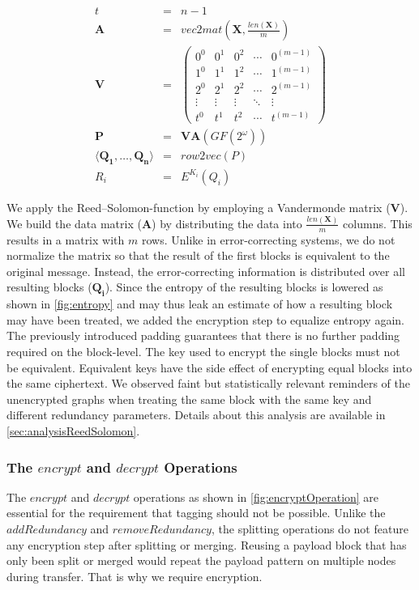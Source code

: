 \begin{eqnarray}
	t          & = & n-1\\%
	\mathbf{A} & = & vec2mat\left(\mathbf{X},\frac{len\left(\mathbf{X}\right)}{m}\right)\\
	\mathbf{V} & = & \left(\begin{matrix}
		0^0 & 0^1 & 0^2 & \cdots & 0^{(m-1)} \\
		1^0 & 1^1 & 1^2 & \cdots & 1^{(m-1)} \\
		2^0 & 2^1 & 2^2 & \cdots & 2^{(m-1)} \\
		\vdots & \vdots & \vdots & \ddots & \vdots \\
		t^0 & t^1 & t^2 & \cdots & t^{(m-1)}
	\end{matrix}\right)\\
	\mathbf{P} & = & \mathbf{V}\mathbf{A} \left(GF\left(2^\omega\right)\right)\\
	\langle \mathbf{Q_1}, \ldots , \mathbf{Q_n} \rangle & = & row2vec(P)\\
	R_i & = & E^{K_i}\left(Q_i\right)
\end{eqnarray}    

We apply the Reed--Solomon-function by employing a Vandermonde matrix ($\mathbf{V}$). We build the data matrix ($\mathbf{A}$) by distributing the data into $\frac{len\left(\mathbf{X}\right)}{m}$ columns. This results in a matrix with $m$ rows. Unlike in error-correcting systems, we do not normalize the matrix so that the result of the first blocks is equivalent to the original message. Instead, the error-correcting information is distributed over all resulting blocks ($\mathbf{Q_i}$). Since the entropy of the resulting blocks is lowered as shown in \cref{fig:entropy} and may thus leak an estimate of how a resulting block may have been treated, we added the encryption step to equalize entropy again. The previously introduced padding guarantees that there is no further padding required on the block-level. The key used to encrypt the single blocks must not be equivalent. Equivalent keys have the side effect of encrypting equal blocks into the same ciphertext. We observed faint but statistically relevant reminders of the unencrypted graphs when treating the same block with the same key and different redundancy parameters. Details about this analysis are available in \cref{sec:analysisReedSolomon}.

\subsubsection{The \texorpdfstring{$encrypt$ and $decrypt$}{encrypt and decrypt} Operations}
The $encrypt$ and $decrypt$ operations as shown in \cref{fig:encryptOperation} are essential for the requirement that tagging should not be possible. Unlike the $addRedundancy$ and $removeRedundancy$, the splitting operations do not feature any encryption step after splitting or merging. Reusing a payload block that has only been split or merged would repeat the payload pattern on multiple nodes during transfer. That is why we require encryption.


